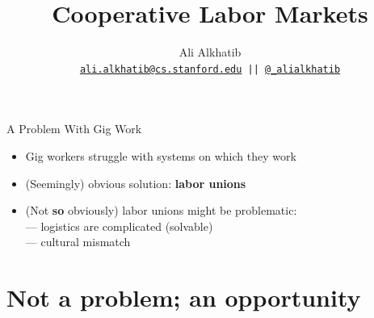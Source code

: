 \documentclass{beamer}
\title{Cooperative Labor Markets}
\author{Ali Alkhatib \\
\texttt{ \href{mailto:ali.alkhatib@cs.stanford.edu}{ali.alkhatib@cs.stanford.edu} ||
         \href{http://twitter.com/_alialkhatib}{@\_alialkhatib} }}
\institute[Stanford]{Stanford University}
\date{\usdate{\formatdate{27}{2}{2016}}}
\begin{document}
\begin{frame}
\titlepage
\end{frame}


\begin{frame}{A Problem With Gig Work}
  \begin{itemize}[<+- | alert@+>]
    \item Gig workers struggle with systems on which they work
      \cite{turkopticon,uberAlgorithm,dynamo}
    \item (Seemingly) obvious solution: \textbf{labor unions}
    \item (Not \textbf{so} obviously) labor unions might be problematic:
      \\ --- logistics are complicated (solvable)
      \\ --- cultural mismatch
        \cite{dynamo}
  \end{itemize}
\end{frame}


\section{Not a problem; an opportunity}
\end{document}
